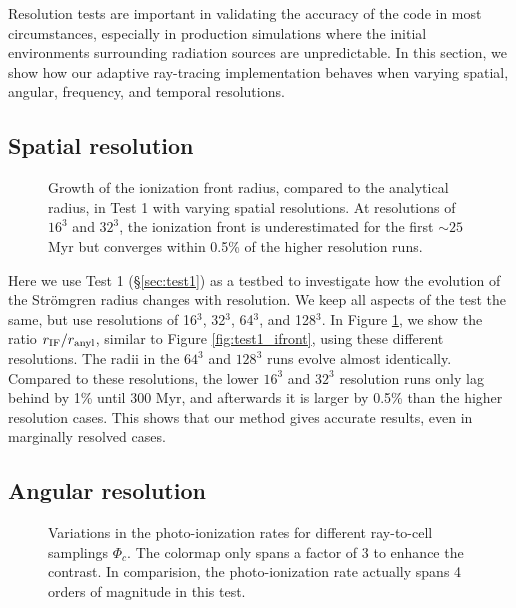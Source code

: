 \documentclass[12pt,preprint]{aastex}
\begin{document}
Resolution tests are important in validating the accuracy of the code
in most circumstances, especially in production simulations where the
initial environments surrounding radiation sources are unpredictable.
In this section, we show how our adaptive ray-tracing implementation
behaves when varying spatial, angular, frequency, and temporal
resolutions.

\subsection{Spatial resolution}

\begin{figure}[t]
  \caption{\label{fig:dx_dep1} Growth of the ionization front radius,
    compared to the analytical radius, in Test 1 with varying spatial
    resolutions.  At resolutions of $16^3$ and $32^3$, the ionization
    front is underestimated for the first $\sim25$ Myr but converges
    within 0.5\% of the higher resolution runs.}
\end{figure}

Here we use Test 1 (\S\ref{sec:test1}) as a testbed to investigate how
the evolution of the Str\"{o}mgren radius changes with resolution.  We
keep all aspects of the test the same, but use resolutions of 16$^3$,
32$^3$, 64$^3$, and 128$^3$.  In Figure \ref{fig:dx_dep1}, we show the
ratio $r_{\rm IF}/r_{\rm anyl}$, similar to Figure
\ref{fig:test1_ifront}, using these different resolutions.  The radii
in the $64^3$ and $128^3$ runs evolve almost identically.  Compared to
these resolutions, the lower $16^3$ and $32^3$ resolution runs only
lag behind by 1\% until 300 Myr, and afterwards it is larger by 0.5\%
than the higher resolution cases.  This shows that our method gives
accurate results, even in marginally resolved cases.

\subsection{Angular resolution}
\label{sec:ang_dep}

\begin{figure}[t]
  \caption{\label{fig:ang_dep1} Variations in the photo-ionization
    rates for different ray-to-cell samplings $\Phi_c$.  The colormap
    only spans a factor of 3 to enhance the contrast.  In comparision,
    the photo-ionization rate actually spans 4 orders of magnitude in
    this test.}
\end{figure}
\end{document}
